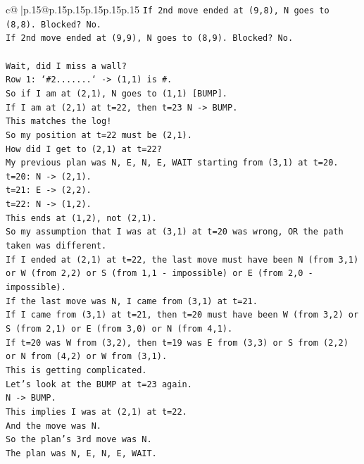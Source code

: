 \documentclass{article}
\begin{document}
{\begin{supertabular}{c@{$\;$}|p{.15\linewidth}@{}p{.15\linewidth}p{.15\linewidth}p{.15\linewidth}p{.15\linewidth}p{.15\linewidth}}
{{{\texttt{If 2nd move ended at (9,8), N goes to (8,8). Blocked? No.} \\
\texttt{If 2nd move ended at (9,9), N goes to (8,9). Blocked? No.} \\
\\ 
\texttt{Wait, did I miss a wall?} \\
\texttt{Row 1: `\#2.......` {-}> (1,1) is \#.} \\
\texttt{So if I am at (2,1), N goes to (1,1) {[}BUMP{]}.} \\
\texttt{If I am at (2,1) at t=22, then t=23 N {-}> BUMP.} \\
\texttt{This matches the log!} \\
\texttt{So my position at t=22 must be (2,1).} \\
\texttt{How did I get to (2,1) at t=22?} \\
\texttt{My previous plan was N, E, N, E, WAIT starting from (3,1) at t=20.} \\
\texttt{t=20: N {-}> (2,1).} \\
\texttt{t=21: E {-}> (2,2).} \\
\texttt{t=22: N {-}> (1,2).} \\
\texttt{This ends at (1,2), not (2,1).} \\
\texttt{So my assumption that I was at (3,1) at t=20 was wrong, OR the path taken was different.} \\
\texttt{If I ended at (2,1) at t=22, the last move must have been N (from 3,1) or W (from 2,2) or S (from 1,1 {-} impossible) or E (from 2,0 {-} impossible).} \\
\texttt{If the last move was N, I came from (3,1) at t=21.} \\
\texttt{If I came from (3,1) at t=21, then t=20 must have been W (from 3,2) or S (from 2,1) or E (from 3,0) or N (from 4,1).} \\
\texttt{If t=20 was W from (3,2), then t=19 was E from (3,3) or S from (2,2) or N from (4,2) or W from (3,1).} \\
\texttt{This is getting complicated.} \\
\texttt{Let's look at the BUMP at t=23 again.} \\
\texttt{N {-}> BUMP.} \\
\texttt{This implies I was at (2,1) at t=22.} \\
\texttt{And the move was N.} \\
\texttt{So the plan's 3rd move was N.} \\
\texttt{The plan was N, E, N, E, WAIT.} \\
}}}
\end{supertabular}}
\end{document}
